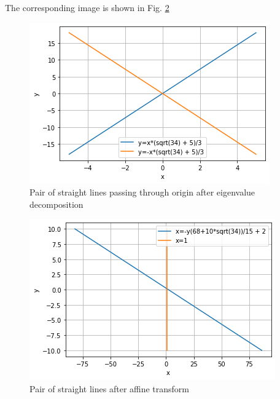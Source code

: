 \documentclass[journal,12pt,twocolumn]{IEEEtran}
\begin{document}
The corresponding image is shown in Fig. \ref{fig:fig3}
\renewcommand{\thefigure}{2}
\begin{figure}[h!]
    \centering
    \includegraphics[width=\columnwidth]{assignment3.1.png}
    \caption{Pair of straight lines passing through origin after eigenvalue decomposition}
    \label{fig:fig2}
\end{figure}
\renewcommand{\thefigure}{3}
\begin{figure}[h!]
    \centering
    \includegraphics[width=\columnwidth]{assignment3.2.png}
    \caption{Pair of straight lines after affine transform}
    \label{fig:fig3}
\end{figure}
\end{document}
